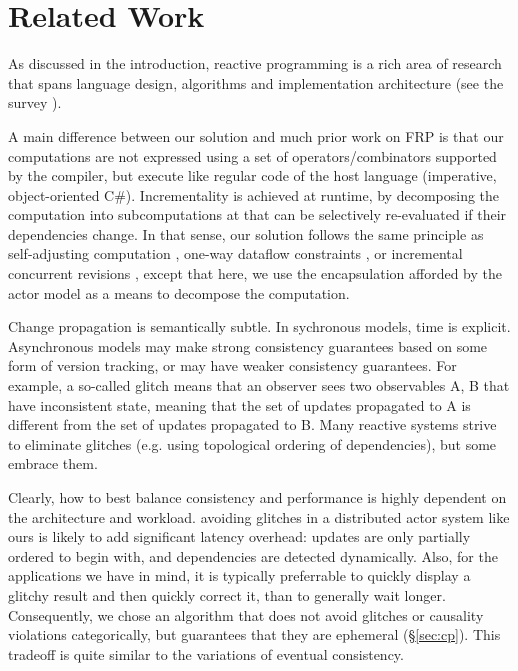 \section{Related Work}

As discussed in the introduction, reactive programming is a rich area of research that spans language design, algorithms and implementation architecture (see the survey \cite{reactivesurvey}).

A main difference between our solution and much prior work on FRP \cite{frp-firstprinciples,frp-animation,frp-frtime,elm,afp} is that our computations are not expressed using a set of operators/combinators supported by the compiler, but execute like regular code of the host language (imperative, object-oriented C\#). Incrementality is achieved at runtime, by decomposing the computation into subcomputations at that can be selectively re-evaluated if their dependencies change. In that sense, our solution follows the same principle as self-adjusting computation \cite{acar-ahmed-blume-POPL08,Acar:SelfAdjustingExperiments,Acar:SelfAdjustingOverview,Hammer:Ceal09,Acar:SelfAdjustingTypes10}, one-way dataflow constraints \cite{camil}, or incremental concurrent revisions \cite{burckhardt-leijen-yi-sadowski-ball-OOPSLA11}, except that here, we use the encapsulation afforded by the actor model as a means to decompose the computation.

Change propagation is semantically subtle. In sychronous models, time is explicit. Asynchronous models may make strong consistency guarantees based on some form of version tracking, or may have weaker consistency guarantees. For example, a so-called glitch means that an observer sees two observables A, B that have inconsistent state, meaning that the set of updates propagated to A is different from the set of updates propagated to B. Many reactive systems strive to eliminate glitches (e.g. using topological ordering of dependencies), but some embrace them.

Clearly, how to best balance consistency and performance is highly dependent on the architecture and workload. 
avoiding glitches in a distributed actor system like ours is likely to add significant latency overhead: updates are only partially ordered to begin with, and dependencies are detected dynamically. Also, for the applications we have in mind, it is typically preferrable to quickly display a glitchy result and then quickly correct it, than to generally wait longer. Consequently, we chose an algorithm that does not avoid glitches or causality violations categorically, but guarantees that they are ephemeral (\S\ref{sec:cp}). This tradeoff is quite similar to the variations of eventual consistency.
 

